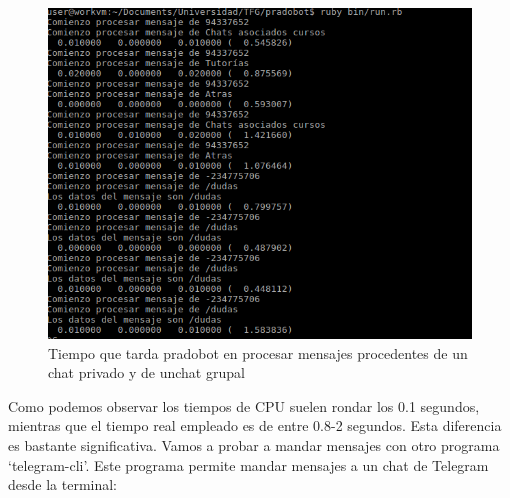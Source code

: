 \begin{figure}[H] %
\centering
\includegraphics[scale=0.5]{imagenes/random/rend2.png}  %
\caption{Tiempo que tarda pradobot en procesar mensajes procedentes de un chat privado y de unchat grupal}\label{figura94}
\end{figure}

Como podemos observar los tiempos de CPU suelen rondar los 0.1 segundos, mientras que el tiempo real empleado es de entre 0.8-2 segundos. Esta diferencia es bastante significativa. Vamos a probar a mandar mensajes con otro programa  \enquote*{telegram-cli}. Este programa permite mandar mensajes a un chat de Telegram desde la terminal:


